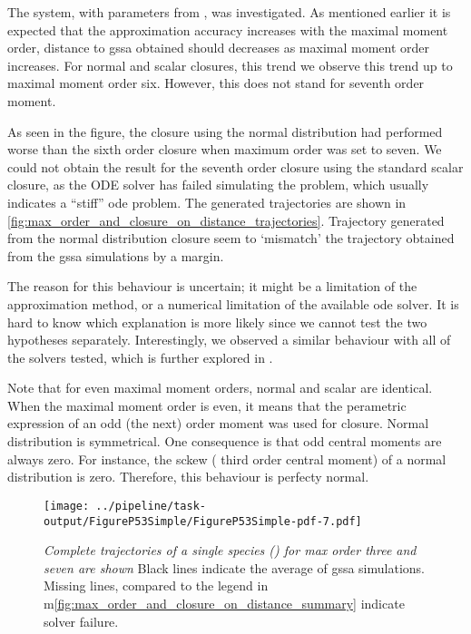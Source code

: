 The \pft{} system, with parameters from \cite{ale_general_2013}, was investigated.
As mentioned earlier it is expected that the approximation accuracy increases with the maximal moment order, \ie{} distance to \gls{gssa} obtained should decreases
 as maximal moment order increases. 
For normal and scalar closures, this trend we observe this trend up to maximal moment order six. 
However, this does not stand for seventh order moment.


As seen in the figure, the closure using the normal distribution had performed worse than the sixth order closure when maximum order was set to seven.
We could not obtain the result for the seventh order closure using the standard scalar closure, as the ODE solver has failed simulating the problem, which usually indicates a ``stiff'' \gls{ode} problem. 
The generated trajectories are shown in \autoref{fig:max_order_and_closure_on_distance_trajectories}. 
Trajectory generated from the normal distribution closure seem to `mismatch' the trajectory obtained from the \gls{gssa} simulations by a margin.

The reason for this behaviour is uncertain; it might be a limitation of the approximation method, or a numerical limitation of the available \gls{ode} solver.
It is hard to know which explanation is more likely since we cannot test the two hypotheses separately. 
Interestingly, we observed a similar behaviour with all of the solvers tested, which is further explored in .

Note that for even maximal moment orders, normal and scalar are identical.
When the maximal moment order is even, it means that the perametric expression of an odd (the next) order moment was used for closure.
Normal distribution is symmetrical. One consequence is that odd central moments are always zero. 
For instance, the sckew (\ie{} third order central moment) of a normal distribution is zero.
Therefore, this behaviour is perfecty normal.


\begin{figure}
    \centering
    \texttt{[image: ../pipeline/task-output/FigureP53Simple/FigureP53Simple-pdf-7.pdf]}
    \caption{\emph{Complete trajectories of a single species (\pft) for max order three and seven are shown} Black lines indicate the average of \gls{gssa} simulations. Missing lines, compared to the legend in  m\autoref{fig:max_order_and_closure_on_distance_summary} indicate solver failure.}
    \label{fig:max_order_and_closure_on_distance_trajectories}
\end{figure}

